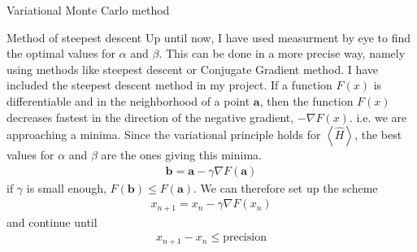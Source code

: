 \documentclass[a4paper, 12pt, titlepage]{article}
\begin{document}
\begin{section}{Variational Monte Carlo method}
 \begin{subsection}{Method of steepest descent}
  	Up until now, I have used measurment by eye to find the optimal values for $\alpha$ and $\beta$. This can be done in a more precise way, namely using methods like steepest descent or Conjugate Gradient method. I have included the steepest descent method in my project.
 If a function $F(x)$ is differentiable and in the neighborhood of a point $\mathbf{a}$, then the function $F(x)$ decreases fastest in the direction of the negative gradient, $-\nabla F(x)$. i.e. we are approaching a minima. Since the variational principle holds for $\left<\hat H\right> $, the best values for $\alpha$ and $\beta$ are the ones giving this minima. 
 \begin{align*}
 	\mathbf{b} = \mathbf{a} - \gamma \nabla F(\mathbf{a}) 
 \end{align*}
 if $\gamma$ is small enough, $F(\mathbf{b}) \leq F(\mathbf{a})$. We can therefore set up the scheme
 \begin{align*}
 	x_{n+1} = x_n - \gamma \nabla F(x_n)
 \end{align*}
 and continue until
 \begin{align*}
 	x_{n+1} - x_n \leq \text{precision}
 \end{align*}
  \end{subsection}

\end{section}
\newpage
\end{document}
